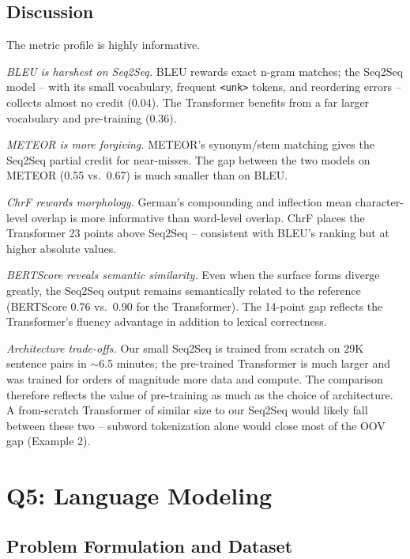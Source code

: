 \documentclass[11pt,a4paper]{article}
\begin{document}
\subsection{Discussion}

The metric profile is highly informative.

\textit{BLEU is harshest on Seq2Seq.} BLEU rewards exact n-gram matches; the Seq2Seq model -- with its small vocabulary, frequent \texttt{<unk>} tokens, and reordering errors -- collects almost no credit (0.04). The Transformer benefits from a far larger vocabulary and pre-training (0.36).

\textit{METEOR is more forgiving.} METEOR's synonym/stem matching gives the Seq2Seq partial credit for near-misses. The gap between the two models on METEOR (0.55 vs.\ 0.67) is much smaller than on BLEU.

\textit{ChrF rewards morphology.} German's compounding and inflection mean character-level overlap is more informative than word-level overlap. ChrF places the Transformer 23 points above Seq2Seq -- consistent with BLEU's ranking but at higher absolute values.

\textit{BERTScore reveals semantic similarity.} Even when the surface forms diverge greatly, the Seq2Seq output remains semantically related to the reference (BERTScore 0.76 vs.\ 0.90 for the Transformer). The 14-point gap reflects the Transformer's fluency advantage in addition to lexical correctness.

\textit{Architecture trade-offs.} Our small Seq2Seq is trained from scratch on 29K sentence pairs in $\sim$6.5 minutes; the pre-trained Transformer is much larger and was trained for orders of magnitude more data and compute. The comparison therefore reflects the value of pre-training as much as the choice of architecture. A from-scratch Transformer of similar size to our Seq2Seq would likely fall between these two -- subword tokenization alone would close most of the OOV gap (Example 2).

\section{Q5: Language Modeling}

\subsection{Problem Formulation and Dataset}
\end{document}
